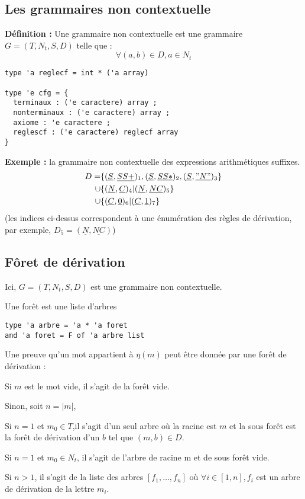 \documentclass[a4paper,12pt]{article}
\newcommand{\norm}[1]{\lvert #1 \rvert}
\newlength{\mydepth}
\newlength{\myheight}
\newenvironment{answer}
{\par\begin{lrbox}{\mybox}\quad\begin{minipage}{\linewidth}\color{black}\setlength{\parskip}{10pt plus 1pt minus 1pt}\vspace*{-.7\baselineskip}}
{\end{minipage}\end{lrbox}
\settodepth{\mydepth}{\usebox{\mybox}}
\settoheight{\myheight}{\usebox{\mybox}}
\addtolength{\myheight}{\mydepth}
\noindent\makebox[0pt]{
  \color{gray}\hspace{-0pt}\rule[-\mydepth]{1pt}{\myheight}}
  \usebox{\mybox}
  }
\begin{document}
\subsection{Les grammaires non contextuelle}

\textbf{  Définition : } Une grammaire non contextuelle est une grammaire $G = (T,N_t,S,D)$ telle que :
\begin{equation*} \forall (a,b) \in D, a \in N_t  \end{equation*}


{\color{DarkBlue}\begin{verbatim}
type 'a reglecf = int * ('a array)

type 'e cfg = {
  terminaux : ('e caractere) array ;
  nonterminaux : ('e caractere) array ;
  axiome : 'e caractere ;
  reglescf : ('e caractere) reglecf array
}
\end{verbatim}}

\textbf{ Exemple : } la grammaire non contextuelle des expressions arithmétiques suffixes.
\begin{align*}
D = &\{(\underline{ S },\underline{ SS+ })_1,(\underline{ S },\underline{ SS* })_2,(\underline{ S },\underline{ "N" })_3\}\\
\cup&\{(\underline{ N },\underline{ C })_4 | (\underline{ N },\underline{ NC })_5\}\\
\cup&\{(\underline{ C },\underline{ 0 })_6 | (\underline{ C },\underline{  1 })_7\}
\end{align*}
(les indices ci-dessus correspondent à une énumération des règles de dérivation, par exemple, $D_5 = (\underline{ N },\underline{ NC })$)

\subsection{Fôret de dérivation}

Ici, $G = (T,N_t,S,D)$ est une grammaire non contextuelle.

Une forêt est une liste d'arbres
{\color{DarkBlue}\begin{verbatim}
type 'a arbre = 'a * 'a foret 
and 'a foret = F of 'a arbre list
\end{verbatim}}


Une preuve qu'un mot appartient à $\eta(m)$ peut être donnée par une forêt de dérivation :

\begin{answer} 
Si $m$ est le mot vide, il s'agit de la forêt vide.

Sinon, soit $n = \norm{m}$,\\
\begin{answer} 
    Si $n=1$ et $m_0 \in T$,il s'agit d'un seul arbre où la racine est $m$ et la sous forêt est la forêt de dérivation d'un $b$ tel que $(m,b) \in D$.

    Si $n=1$ et $m_0 \in N_t$, il s'agit de l'arbre de racine m et de sous forêt vide.

    Si $n>1$, il s'agit de la liste des arbres $[f_1, \dots, f_n]$ où $\forall i \in [1,n], f_i$ est un arbre de dérivation de la lettre $m_i$.
\end{answer}
\end{answer}
\end{document}
